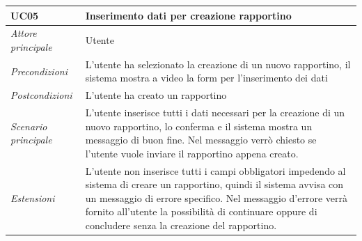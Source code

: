 		\begin{center}
			\begin{tabularx}{\textwidth}{p{3cm} p{9.30cm}}
				\hline
				\textbf{UC05} & \textbf{Inserimento dati per creazione rapportino} \\
				\hline
				\textit{Attore principale} & Utente \\
				\hline
				\textit{Precondizioni} & L’utente ha selezionato la creazione di un nuovo rapportino, il sistema mostra a video la form per l’inserimento dei dati\\
				\hline
				\textit{Postcondizioni} & L’utente ha creato un rapportino\\
				\hline
				\textit{Scenario principale} & L’utente inserisce tutti i dati necessari per la creazione di un nuovo rapportino, lo conferma e il sistema mostra un messaggio di buon fine. Nel messaggio verrò chiesto se l’utente vuole inviare il rapportino appena creato.\\
				\hline
				\textit{Estensioni} & L’utente non inserisce tutti i campi obbligatori impedendo al sistema di creare un rapportino, quindi il sistema avvisa con un messaggio di errore specifico. Nel messaggio d’errore verrà fornito all’utente la possibilità di continuare oppure di concludere senza la creazione del rapportino.\\
				\hline
			\end{tabularx}
		\end{center}
	
